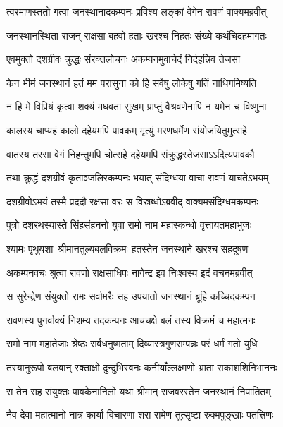 
\twolineshloka
{त्वरमाणस्ततो गत्वा जनस्थानादकम्पनः}
{प्रविश्य लङ्कां वेगेन रावणं वाक्यमब्रवीत्} %

\twolineshloka
{जनस्थानस्थिता राजन् राक्षसा बहवो हताः}
{खरश्च निहतः संख्ये कथंचिदहमागतः} %

\twolineshloka
{एवमुक्तो दशग्रीवः क्रुद्धः संरक्तलोचनः}
{अकम्पनमुवाचेदं निर्दहन्निव तेजसा} %

\twolineshloka
{केन भीमं जनस्थानं हतं मम परासुना}
{को हि सर्वेषु लोकेषु गतिं नाधिगमिष्यति} %

\twolineshloka
{न हि मे विप्रियं कृत्वा शक्यं मघवता सुखम्}
{प्राप्तुं वैश्रवणेनापि न यमेन च विष्णुना} %

\twolineshloka
{कालस्य चाप्यहं कालो दहेयमपि पावकम्}
{मृत्युं मरणधर्मेण संयोजयितुमुत्सहे} %

\twolineshloka
{वातस्य तरसा वेगं निहन्तुमपि चोत्सहे}
{दहेयमपि संक्रुद्धस्तेजसाऽऽदित्यपावकौ} %

\twolineshloka
{तथा क्रुद्धं दशग्रीवं कृताञ्जलिरकम्पनः}
{भयात् संदिग्धया वाचा रावणं याचतेऽभयम्} %

\twolineshloka
{दशग्रीवोऽभयं तस्मै प्रददौ रक्षसां वरः}
{स विस्रब्धोऽब्रवीद् वाक्यमसंदिग्धमकम्पनः} %

\twolineshloka
{पुत्रो दशरथस्यास्ते सिंहसंहननो युवा}
{रामो नाम महास्कन्धो वृत्तायतमहाभुजः} %

\twolineshloka
{श्यामः पृथुयशाः श्रीमानतुल्यबलविक्रमः}
{हतस्तेन जनस्थाने खरश्च सहदूषणः} %

\twolineshloka
{अकम्पनवचः श्रुत्वा रावणो राक्षसाधिपः}
{नागेन्द्र इव निःश्वस्य इदं वचनमब्रवीत्} %

\twolineshloka
{स सुरेन्द्रेण संयुक्तो रामः सर्वामरैः सह}
{उपयातो जनस्थानं ब्रूहि कच्चिदकम्पन} %

\twolineshloka
{रावणस्य पुनर्वाक्यं निशम्य तदकम्पनः}
{आचचक्षे बलं तस्य विक्रमं च महात्मनः} %

\twolineshloka
{रामो नाम महातेजाः श्रेष्ठः सर्वधनुष्मताम्}
{दिव्यास्त्रगुणसम्पन्नः परं धर्मं गतो युधि} %

\twolineshloka
{तस्यानुरूपो बलवान् रक्ताक्षो दुन्दुभिस्वनः}
{कनीयाँल्लक्ष्मणो भ्राता राकाशशिनिभाननः} %

\twolineshloka
{स तेन सह संयुक्तः पावकेनानिलो यथा}
{श्रीमान् राजवरस्तेन जनस्थानं निपातितम्} %

\twolineshloka
{नैव देवा महात्मानो नात्र कार्या विचारणा}
{शरा रामेण तूत्सृष्टा रुक्मपुङ्खाः पतत्त्रिणः} %

